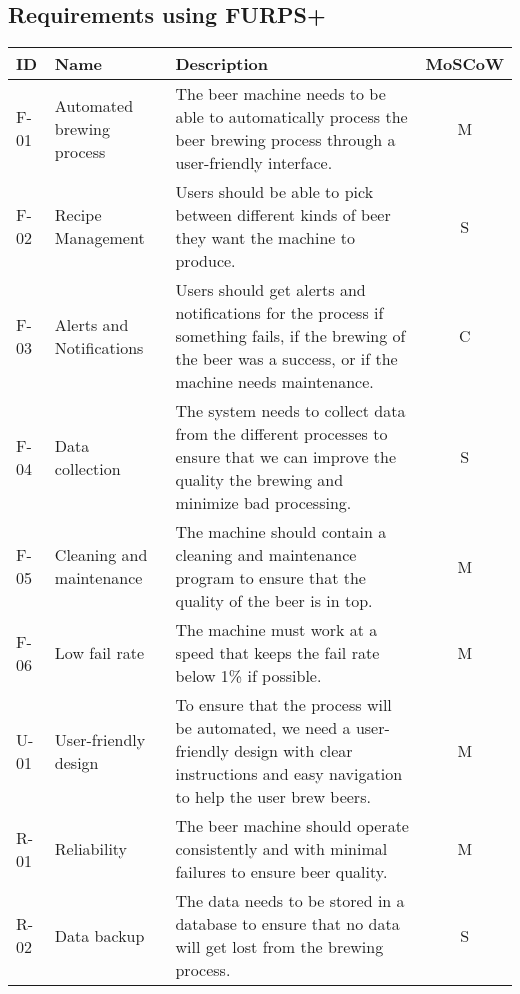 \subsection{Requirements using FURPS+}
\begin{center}
    \sloppy
    \begin{longtable}{|p{1cm}|p{4cm}|p{8.5cm}|c|}
        \hline
        ID & Name & Description & MoSCoW \\ \hline
        F-01   & Automated brewing process  & The beer machine needs to be able to automatically process the beer brewing process through a user-friendly interface.                                        & M \\ \hline
        F-02   & Recipe Management          & Users should be able to pick between different kinds of beer they want the machine to produce.                                                                & S \\ \hline                                                          
        F-03   & Alerts and Notifications   & Users should get alerts and notifications for the process if something fails, if the brewing of the beer was a success, or if the machine needs maintenance.   & C \\ \hline
        F-04   & Data collection            & The system needs to collect data from the different processes to ensure that we can improve the quality the brewing and minimize bad processing.                     & S \\ \hline
        F-05   & Cleaning and maintenance   & The machine should contain a cleaning and maintenance program to ensure that the quality of the beer is in top.                                               & M \\ \hline
        F-06   & Low fail rate              & The machine must work at a speed that keeps the fail rate below 1\% if possible.                                                                                & M \\ \hline
        U-01   & User-friendly design       & To ensure that the process will be automated, we need a user-friendly design with clear instructions and easy navigation to help the user brew beers.          & M \\ \hline
        R-01   & Reliability                & The beer machine should operate consistently and with minimal failures to ensure beer quality.                                                                & M \\ \hline
        R-02   & Data backup                & The data needs to be stored in a database to ensure that no data will get lost from the brewing process.                                                           & S \\ \hline

\end{longtable}
\end{center}
